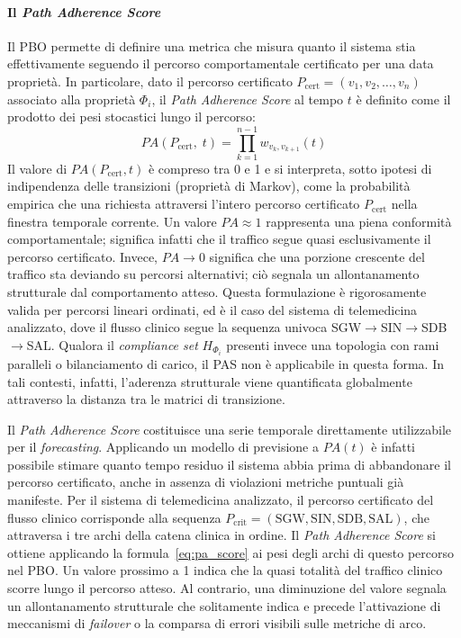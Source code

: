 \paragraph{Il \textit{Path Adherence Score}}
\label{sec:path_adherence_score}

Il \gls{PBO} permette di definire una metrica che misura quanto il sistema stia effettivamente
seguendo il percorso comportamentale certificato per una data proprietà. In particolare, dato il
percorso certificato $P_{\text{cert}} = (v_1, v_2, \ldots, v_n)$ associato alla proprietà $\Phi_i$,
il \textit{Path Adherence Score} al tempo $t$ è definito come il prodotto dei pesi stocastici lungo
il percorso:
\begin{equation}
\label{eq:pa_score}
PA(P_{\text{cert}},\; t) = \prod_{k=1}^{n-1} w_{v_k, v_{k+1}}(t)
\end{equation}
Il valore di $PA(P_{\text{cert}}, t)$ è compreso tra 0 e 1 e si interpreta, sotto ipotesi di
indipendenza delle transizioni (proprietà di Markov), come la probabilità empirica che una
richiesta attraversi l'intero percorso certificato $P_{\text{cert}}$ nella finestra temporale
corrente. Un valore $PA \approx 1$ rappresenta una piena conformità comportamentale;
significa infatti che il traffico segue quasi esclusivamente il percorso certificato. Invece,
$PA \to 0$ significa che una porzione crescente del traffico sta deviando su
percorsi alternativi; ciò segnala un allontanamento strutturale dal comportamento atteso. Questa
formulazione è rigorosamente valida per percorsi lineari ordinati, ed è il caso del sistema di
telemedicina analizzato, dove il flusso clinico segue la sequenza univoca
SGW$\to$SIN$\to$SDB$\to$SAL. Qualora il \textit{compliance set} $H_{\Phi_i}$ presenti invece una
topologia con rami paralleli o bilanciamento di carico, il \gls{PAS} non è applicabile in questa
forma. In tali contesti, infatti, l'aderenza strutturale viene quantificata globalmente attraverso
la distanza tra le matrici di transizione.

Il \textit{Path Adherence Score} costituisce una serie temporale direttamente utilizzabile per il
\textit{forecasting}. Applicando un modello di previsione a $PA(t)$ è infatti possibile stimare
quanto tempo residuo il sistema abbia prima di abbandonare il percorso certificato, anche in
assenza di violazioni metriche puntuali già manifeste.
Per il sistema di telemedicina analizzato, il percorso certificato del flusso clinico corrisponde
alla sequenza $P_{\text{crit}} = (\text{SGW}, \text{SIN}, \text{SDB}, \text{SAL})$, che attraversa
i tre archi della catena clinica in ordine. Il \textit{Path Adherence Score} si ottiene applicando
la formula~\eqref{eq:pa_score} ai pesi degli archi di questo percorso nel \gls{PBO}. Un valore
prossimo a 1 indica che la quasi totalità del traffico clinico scorre lungo il percorso atteso.
Al contrario, una diminuzione del valore segnala un allontanamento strutturale che solitamente
indica e precede l'attivazione di meccanismi di \textit{failover} o la comparsa di errori visibili
sulle metriche di arco.

